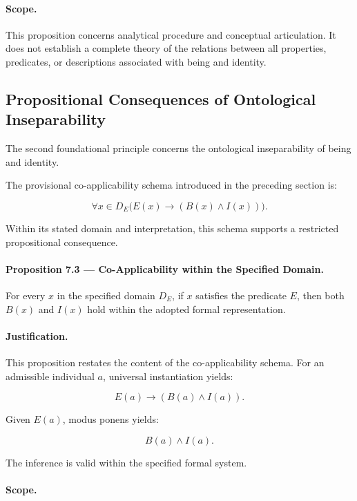 \paragraph{Scope.}

This proposition concerns analytical procedure and conceptual
articulation. It does not establish a complete theory of the
relations between all properties, predicates, or descriptions
associated with being and identity.

\subsection{Propositional Consequences of Ontological
Inseparability}

The second foundational principle concerns the ontological
inseparability of being and identity.

The provisional co-applicability schema introduced in the
preceding section is:

\[
    \forall x \in D_E
    \bigl(E(x) \rightarrow (B(x) \land I(x))\bigr).
\]

Within its stated domain and interpretation, this schema
supports a restricted propositional consequence.

\paragraph{Proposition 7.3 — Co-Applicability within the
Specified Domain.}

For every \(x\) in the specified domain \(D_E\), if \(x\)
satisfies the predicate \(E\), then both \(B(x)\) and \(I(x)\)
hold within the adopted formal representation.

\paragraph{Justification.}

This proposition restates the content of the co-applicability
schema. For an admissible individual \(a\), universal
instantiation yields:

\[
    E(a) \rightarrow (B(a) \land I(a)).
\]

Given \(E(a)\), modus ponens yields:

\[
    B(a) \land I(a).
\]

The inference is valid within the specified formal system.

\paragraph{Scope.}

